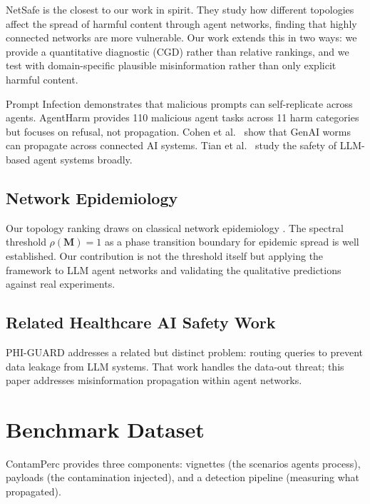 \documentclass{ieeeaccess}
\begin{document}
NetSafe \cite{yu2025netsafe} is the closest to our work in spirit.
They study how different topologies affect the spread of harmful
content through agent networks, finding that highly connected
networks are more vulnerable. Our work extends this in two ways:
we provide a quantitative diagnostic (CGD) rather than relative
rankings, and we test with domain-specific plausible
misinformation rather than only explicit harmful content.

Prompt Infection \cite{lee2024promptinfection} demonstrates that
malicious prompts can self-replicate across agents. AgentHarm
\cite{andriushchenko2025agentharm} provides 110 malicious agent
tasks across 11 harm categories but focuses on refusal, not
propagation. Cohen et al.\ \cite{cohen2024aiworm} show that
GenAI worms can propagate across connected AI systems. Tian et
al.\ \cite{tian2024evilgeniuses} study the safety of LLM-based
agent systems broadly.

\subsection{Network Epidemiology}

Our topology ranking draws on classical network epidemiology
\cite{pastorsatorras2015,vanmieghem2009,wang2003epidemic}. The
spectral threshold $\rho(\mathbf{M}) = 1$ as a phase transition
boundary for epidemic spread is well established. Our contribution
is not the threshold itself but applying the framework to LLM
agent networks and validating the qualitative predictions against
real experiments.

\subsection{Related Healthcare AI Safety Work}

PHI-GUARD \cite{sharma2026phiguard} addresses a related but
distinct problem: routing queries to prevent data leakage from
LLM systems. That work handles the data-out threat; this paper
addresses misinformation propagation within agent networks.

\section{Benchmark Dataset}
\label{sec:dataset}

ContamPerc provides three components: vignettes (the scenarios
agents process), payloads (the contamination injected), and a
detection pipeline (measuring what propagated).
\end{document}

